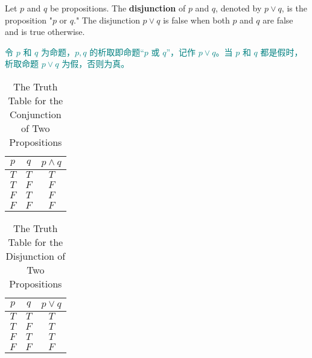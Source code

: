 \documentclass[12pt, a4paper]{article} %
\begin{document}
\begin{definition}
    Let $p$ and $q$ be propositions. The \textbf{disjunction} of $p$ and $q$, denoted by $p \vee q$, is the proposition "$p$ or $q$." The disjunction $p \vee q$ is false when both $p$ and $q$ are false and is true otherwise.
\end{definition}

\begin{theorem}
    \textcolor{teal}{
        令 $p$ 和 $q$ 为命题，$p, q$ 的析取即命题“$p$ 或 $q$”，记作 $p \vee q$。当 $p$ 和 $q$ 都是假时，析取命题 $p \vee q$ 为假，否则为真。
    }
\end{theorem}

\begin{minipage}[c]{0.45\textwidth}
    \centering
    \begin{table}[H]
        \centering
        \caption{The Truth Table for the Conjunction of Two Propositions}
        \begin{tabular}{cc|c}
            \toprule
            $p$ & $q$ & $p \wedge q$ \\
            \midrule
            $T$ & $T$ & $T$          \\
            $T$ & $F$ & $F$          \\
            $F$ & $T$ & $F$          \\
            $F$ & $F$ & $F$          \\
            \bottomrule
        \end{tabular}%
        \label{tab:2}%
    \end{table}%
\end{minipage}
\begin{minipage}[c]{0.45\textwidth}
    \centering
    \begin{table}[H]
        \centering
        \caption{The Truth Table for the Disjunction of Two Propositions}
        \begin{tabular}{cc|c}
            \toprule
            $p$ & $q$ & $p \vee q$ \\
            \midrule
            $T$ & $T$ & $T$        \\
            $T$ & $F$ & $T$        \\
            $F$ & $T$ & $T$        \\
            $F$ & $F$ & $F$        \\
            \bottomrule
        \end{tabular}%
        \label{tab:3}%
    \end{table}%
\end{minipage}
\end{document}
